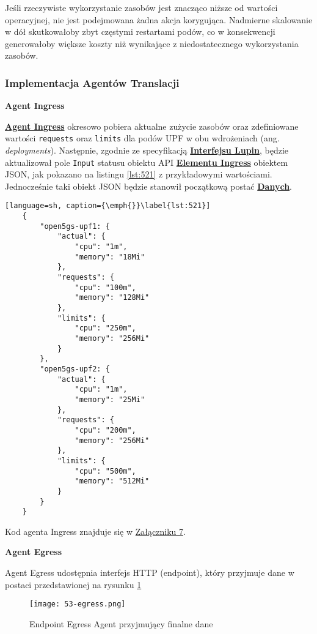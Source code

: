 Jeśli rzeczywiste wykorzystanie zasobów jest znacząco niższe od wartości operacyjnej, nie jest podejmowana żadna akcja korygująca. Nadmierne skalowanie w dół skutkowałoby zbyt częstymi restartami podów, co w konsekwencji generowałoby większe koszty niż wynikające z niedostatecznego wykorzystania zasobów.

\subsubsection{Implementacja Agentów Translacji}

\textbf{Agent Ingress}

\hyperlink{def:agent-ingress}{\textbf{Agent Ingress}} okresowo pobiera aktualne zużycie zasobów oraz zdefiniowane wartości \texttt{requests} oraz \texttt{limits} dla podów UPF w obu wdrożeniach (ang. \textit{deployments}). Następnie, zgodnie ze specyfikacją \hyperlink{def:interfejs-lupin}{\textbf{Interfejsu Lupin}}, będzie aktualizował pole \texttt{Input} statusu obiektu API \hyperlink{def:element-ingres}{\textbf{Elementu Ingress}} obiektem JSON, jak pokazano na listingu \ref{lst:521} z przykładowymi wartościami. Jednocześnie taki obiekt JSON będzie stanowił początkową postać \hyperlink{def:dane}{\textbf{Danych}}.

\begin{lstlisting}[language=sh, caption={\emph{}}\label{lst:521}]
    {
        "open5gs-upf1: {
            "actual": {
                "cpu": "1m",
                "memory": "18Mi"
            },
            "requests": {
                "cpu": "100m",
                "memory": "128Mi"
            },
            "limits": {
                "cpu": "250m",
                "memory": "256Mi"
            }
        },
        "open5gs-upf2: {
            "actual": {
                "cpu": "1m",
                "memory": "25Mi"
            },
            "requests": {
                "cpu": "200m",
                "memory": "256Mi"
            },
            "limits": {
                "cpu": "500m",
                "memory": "512Mi"
            }
        }
    }
\end{lstlisting}

Kod agenta Ingress znajduje się w \hyperlink{appengix:7}{Załączniku 7}.

\textbf{Agent Egress}

Agent Egress udostępnia interfejs HTTP (endpoint), który przyjmuje dane w postaci przedstawionej na rysunku \ref{fig:53-egress}

\begin{figure}[!h]
    \centering \texttt{[image: 53-egress.png]}
    \caption{Endpoint Egress Agent przyjmujący finalne dane}\label{fig:53-egress}
\end{figure}

